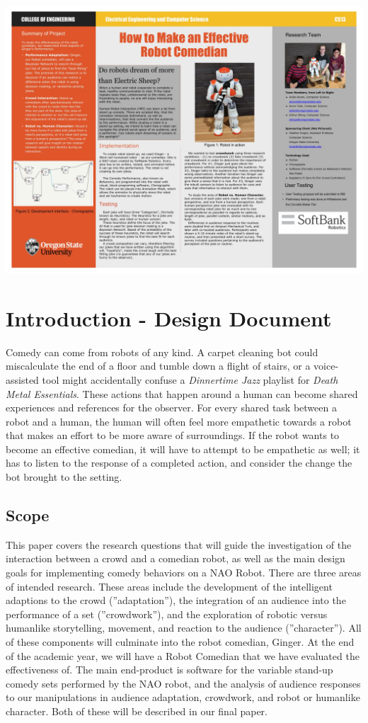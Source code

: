 \documentclass[onecolumn, draftclsnofoot,10pt, compsoc]{IEEEtran}
\begin{document}
  \includegraphics[width=\textwidth]{poster.jpg}


\pagebreak
\section{Introduction - Design Document}

  Comedy can come from robots of any kind. A carpet cleaning bot could miscalculate the end of a floor and tumble down a flight of stairs, or a voice-assisted tool might accidentally confuse a \textit{Dinnertime Jazz} playlist for \textit{Death Metal Essentials}. These actions that happen around a human can become shared experiences and references for the observer. For every shared task between a robot and a human, the human will often feel more empathetic towards a robot that makes an effort to be more aware of surroundings\cite{DesignExBeh:2017}. If the robot wants to become an effective comedian, it will have to attempt to be empathetic as well; it has to listen to the response of a completed action, and consider the change the bot brought to the setting.

\subsection{Scope}
This paper covers the research questions that will guide the investigation of the interaction between a crowd and
a comedian robot, as well as the main design goals for implementing comedy behaviors on a NAO Robot. There
are three areas of intended research. These areas include the development of the intelligent adaptions to the crowd
(”adaptation”), the integration of an audience into the performance of a set (”crowdwork”), and the exploration of
robotic versus humanlike storytelling, movement, and reaction to the audience (”character”). All of these components
will culminate into the robot comedian, Ginger. At the end of the academic year, we will have a Robot Comedian that we
have evaluated the effectiveness of. The main end-product is software for the variable stand-up comedy sets performed
by the NAO robot, and the analysis of audience responses to our manipulations in audience adaptation, crowdwork,
and robot or humanlike character. Both of these will be described in our final paper.
\end{document}
